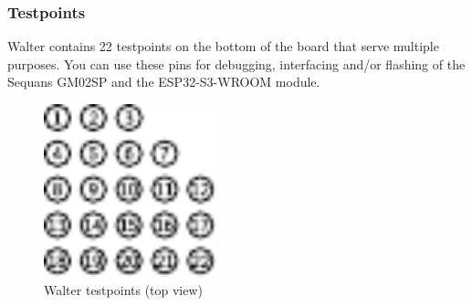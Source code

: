 \documentclass[11pt]{article}
\begin{document}
\newpage
\subsubsection{Testpoints} \label{testpoints}
Walter contains 22 testpoints on the bottom of the board that serve multiple purposes. You can use these pins for debugging, interfacing and/or flashing of the Sequans GM02SP and the ESP32-S3-WROOM module.
\begin{figure}[h]
    \centering
    \includegraphics[height=5cm]{walter-testpoints-topview.pdf}
    \caption{Walter testpoints (top view)}
    \label{fig:testpoints}
\end{figure}
\end{document}
